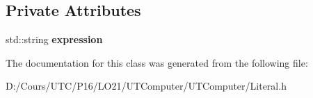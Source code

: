 \subsection*{Private Attributes}
\begin{DoxyCompactItemize}
\item 
std\+::string {\bfseries expression}\hypertarget{class_expression_literal_a16fc29521a43a450dd3a020de9bb02ed}{}\label{class_expression_literal_a16fc29521a43a450dd3a020de9bb02ed}

\end{DoxyCompactItemize}


The documentation for this class was generated from the following file\+:\begin{DoxyCompactItemize}
\item 
D\+:/\+Cours/\+U\+T\+C/\+P16/\+L\+O21/\+U\+T\+Computer/\+U\+T\+Computer/Literal.\+h\end{DoxyCompactItemize}
